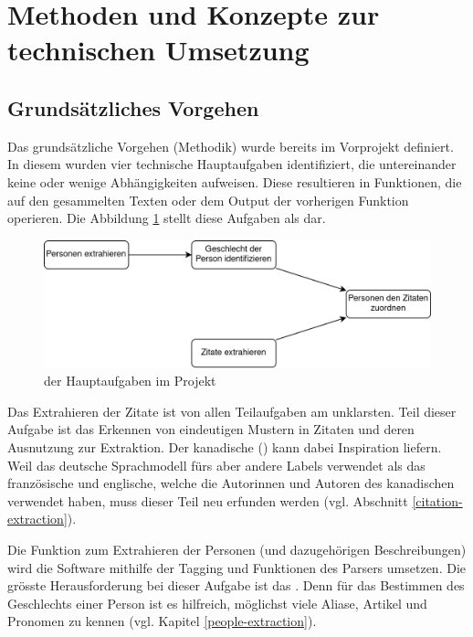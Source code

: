 \section{Methoden und Konzepte zur technischen Umsetzung}

\subsection{Grundsätzliches Vorgehen}

Das grundsätzliche Vorgehen (Methodik) wurde bereits im Vorprojekt
\cite{project2} definiert. In diesem wurden vier technische
Hauptaufgaben identifiziert, die untereinander keine oder wenige
Abhängigkeiten aufweisen. Diese resultieren in Funktionen, die auf
den gesammelten Texten oder dem Output der vorherigen Funktion operieren.
Die Abbildung \ref{dag-tasks} stellt diese Aufgaben als  dar.
\begin{figure}[H]
	\begin{center}
        \centering
		\includegraphics[width=1\linewidth]{./images/Teilaufgaben.jpg}
		\caption{ der Hauptaufgaben im Projekt}
		\label{dag-tasks}
	\end{center}
\end{figure}

Das Extrahieren der Zitate ist von allen Teilaufgaben am unklarsten.
Teil dieser Aufgabe ist das Erkennen von eindeutigen Mustern in Zitaten
und deren Ausnutzung zur Extraktion. Der kanadische  () kann dabei
Inspiration liefern. Weil das deutsche Sprachmodell fürs 
aber andere Labels verwendet als das französische und englische,
welche die Autorinnen und Autoren des kanadischen  verwendet haben,
muss dieser Teil neu erfunden werden (vgl. Abschnitt \ref{citation-extraction}).

Die Funktion zum Extrahieren der Personen (und dazugehörigen Beschreibungen) 
wird die Software mithilfe der  Tagging und  Funktionen des  Parsers umsetzen.
Die grösste Herausforderung bei dieser Aufgabe ist das .
Denn für das Bestimmen des Geschlechts einer Person ist es hilfreich,
möglichst viele Aliase, Artikel und Pronomen zu kennen (vgl. Kapitel \ref{people-extraction}).

